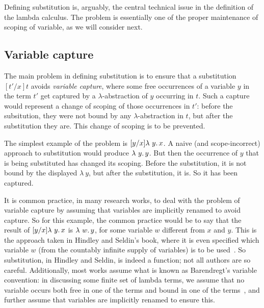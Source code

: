 Defining substitution is, arguably, the central technical issue
in the definition of the lambda calculus.  The problem is essentially
one of the proper maintenance of scoping of variable, as we will
consider next.

\subsection{Variable capture}

 The main problem in defining substitution is to ensure that a
 substitution $[t'/x]t$ avoids \emph{variable capture}, where some
 free occurrences of a variable $y$ in the term $t'$ get captured by a
 $\lambda$-abstraction of $y$ occurring in $t$.  Such a capture would
 represent a change of scoping of those occurrences in $t'$: before
 the subsitution, they were not bound by any $\lambda$-abstraction in
 $t$, but after the substitution they are.  This change of scoping is
 to be prevented.

 The simplest example of the problem is $[y/x]\lambda\ y.\, x$.  A naive
 (and scope-incorrect) approach to substitution would produce $\lambda\ y.\, y$.
 But then the occurrence of $y$ that is being substituted has changed its scoping.  Before the
 substitution, it is not bound by the displayed $\lambda\ y$, but after the
 substitution, it is.  So it has been captured.

 It is common practice, in many research works, to deal with the
 problem of variable capture by assuming that variables are implicitly
 renamed to avoid capture.  So for this example, the common practice
 would be to say that the result of $[y/x]\lambda\ y.\, x$ is $\lambda\ w.\, y$,
 for some variable $w$ different from $x$ and $y$.  This is the
 approach taken in Hindley and Seldin's book, where it is even
 specified which variable $w$ (from the countably infinite supply of
 variables) is to be used~\cite{hindley+08}.  So substitution, in
 Hindley and Seldin, is indeed a function; not all authors are so
 careful.  Additionally, most works assume what is known as
 Barendregt's variable convention: in discussing some finite set of
 lambda terms, we assume that no variable occurs both free in one of
 the terms and bound in one of the terms~\cite[Definition
   2.1.13]{barendregt85}, and further assume that variables are
 implicitly renamed to ensure this.

